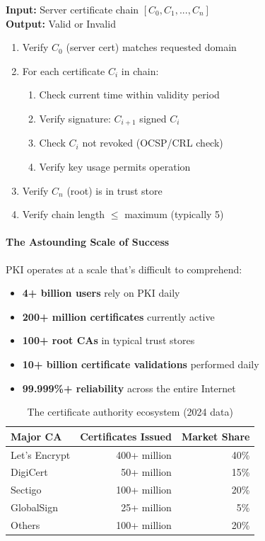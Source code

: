 \documentclass[11pt,a4paper]{article}
\begin{document}
\begin{algorithm}
\caption{Certificate Chain Validation}
\textbf{Input:} Server certificate chain $[C_0, C_1, ..., C_n]$\\
\textbf{Output:} Valid or Invalid
\begin{enumerate}
    \item Verify $C_0$ (server cert) matches requested domain
    \item For each certificate $C_i$ in chain:
        \begin{enumerate}
            \item Check current time within validity period
            \item Verify signature: $C_{i+1}$ signed $C_i$
            \item Check $C_i$ not revoked (OCSP/CRL check)
            \item Verify key usage permits operation
        \end{enumerate}
    \item Verify $C_n$ (root) is in trust store
    \item Verify chain length $\leq$ maximum (typically 5)
\end{enumerate}
\end{algorithm}

\paragraph{The Astounding Scale of Success}

PKI operates at a scale that's difficult to comprehend:

\begin{itemize}
    \item \textbf{4+ billion users} rely on PKI daily
    \item \textbf{200+ million certificates} currently active
    \item \textbf{100+ root CAs} in typical trust stores
    \item \textbf{10+ billion certificate validations} performed daily
    \item \textbf{99.999\%+ reliability} across the entire Internet
\end{itemize}

\begin{table}[h]
\centering
\begin{tabular}{|l|r|r|}
\hline
\textbf{Major CA} & \textbf{Certificates Issued} & \textbf{Market Share} \\
\hline
Let's Encrypt & 400+ million & 40\% \\
DigiCert & 50+ million & 15\% \\
Sectigo & 100+ million & 20\% \\
GlobalSign & 25+ million & 5\% \\
Others & 100+ million & 20\% \\
\hline
\end{tabular}
\caption{The certificate authority ecosystem (2024 data)}
\end{table}
\end{document}
